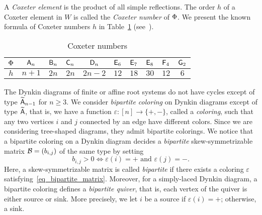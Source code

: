 A \emph{Coxeter element} is the product of all simple
reflections. 
The order $h$ of a Coxeter element in $W$ is called the \emph{Coxeter number}
of $\Phi$. We present the known formula of Coxeter numbers $h$ in
Table~\ref{table_Coxeter_number} (see~\cite[Appendix]{Bourbaki02}).
\begin{table}[b]
	\begin{tabular}{c|ccccccccc}
		\toprule
		$\Phi$ & $\mathsf{A}_n$ & $\mathsf{B}_n$ & $\mathsf{C}_n$ & $\mathsf{D}_n$ & $\mathsf{E}_6$ & $\mathsf{E}_7$ & $\mathsf{E}_8$ & $\mathsf{F}_4$ & $\mathsf{G}_2$ \\
		\midrule
		$h$ & $n+1$ & $2n$ & $2n$ & $2n-2$ & $12$ & $18$ & $30$ & $12$ & $6$ 		\\
		\bottomrule 
	\end{tabular}
\caption{Coxeter numbers}\label{table_Coxeter_number}
\end{table}

The Dynkin diagrams of finite or affine root systems do not have cycles except 
of type $\widetilde{\mathsf{A}}_{n-1}$ for $n \geq 3$.
We consider \emph{bipartite coloring} on Dynkin diagrams except of type $\widetilde{\mathsf{A}}$, that is, we have a function $\varepsilon \colon [n] \to \{+,-\}$, called a \emph{coloring}, such that any two vertices $i$ and $j$ connected by an edge have different colors. 
Since we are considering tree-shaped diagrams, they admit bipartite colorings. 
We notice that a bipartite coloring on a Dynkin diagram decides a \emph{bipartite} skew-symmetrizable matrix $\mathcal{B} = (b_{i,j})$ of the same type by setting
\begin{equation}\label{eq_bipartite_matrix}
b_{i,j} > 0 \iff \varepsilon(i) = + \text{ and } \varepsilon(j) = -.
\end{equation}
Here, a skew-symmetrizable matrix is called \emph{bipartite} if there exists a coloring $\varepsilon$ satisfying~\eqref{eq_bipartite_matrix}.
Moreover, for a simply-laced Dynkin diagram, a bipartite coloring defines a \emph{bipartite quiver}, that is, each vertex of the quiver is either source or sink. More precisely, we let $i$ be a source if $\varepsilon(i) = +$; otherwise, a sink.


